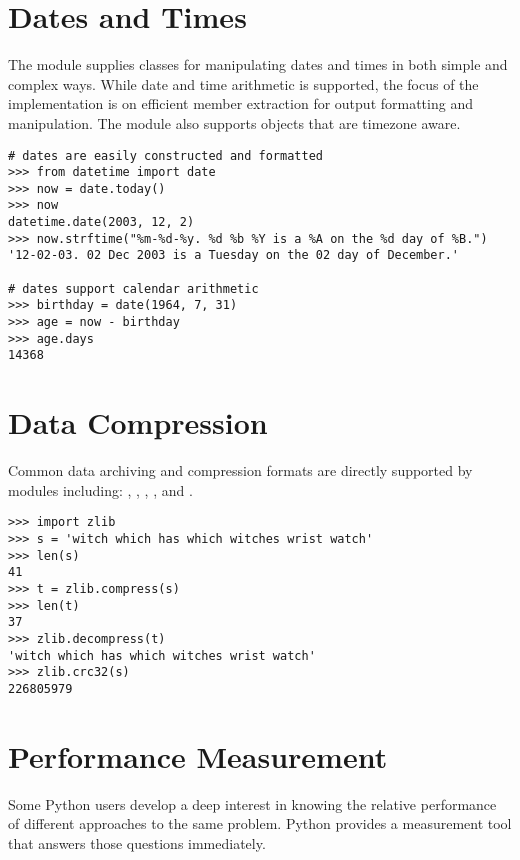 \documentclass{manual}
\begin{document}
\section{Dates and Times\label{dates-and-times}}

The  module
supplies classes for manipulating dates and times in both simple
and complex ways. While date and time arithmetic is supported, the
focus of the implementation is on efficient member extraction for
output formatting and manipulation.  The module also supports objects
that are timezone aware.

\begin{verbatim}
# dates are easily constructed and formatted
>>> from datetime import date
>>> now = date.today()
>>> now
datetime.date(2003, 12, 2)
>>> now.strftime("%m-%d-%y. %d %b %Y is a %A on the %d day of %B.")
'12-02-03. 02 Dec 2003 is a Tuesday on the 02 day of December.'

# dates support calendar arithmetic
>>> birthday = date(1964, 7, 31)
>>> age = now - birthday
>>> age.days
14368
\end{verbatim}


\section{Data Compression\label{data-compression}}

Common data archiving and compression formats are directly supported
by modules including:
,
,
,
, and
.

\begin{verbatim}
>>> import zlib
>>> s = 'witch which has which witches wrist watch'
>>> len(s)
41
>>> t = zlib.compress(s)
>>> len(t)
37
>>> zlib.decompress(t)
'witch which has which witches wrist watch'
>>> zlib.crc32(s)
226805979
\end{verbatim}


\section{Performance Measurement\label{performance-measurement}}

Some Python users develop a deep interest in knowing the relative
performance of different approaches to the same problem.
Python provides a measurement tool that answers those questions
immediately.
\end{document}
